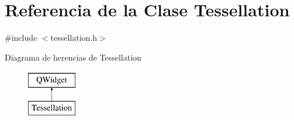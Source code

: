 \hypertarget{class_tessellation}{}\section{Referencia de la Clase Tessellation}
\label{class_tessellation}


{\ttfamily \#include $<$tessellation.\+h$>$}

Diagrama de herencias de Tessellation\begin{figure}[H]
\begin{center}
\leavevmode
\includegraphics[height=2.000000cm]{class_tessellation}
\end{center}
\end{figure}
